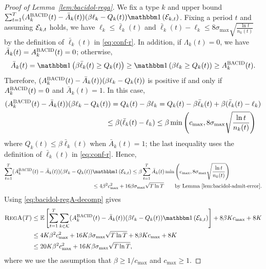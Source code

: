 \begin{proof}[Proof of Lemma~\ref{lem:bacidol-rega}]
We fix a type $k$ and upper bound $\sum_{t=1}^T (A_k^{\bacid}(t) - \bar{A}_k(t))(\beta \ell_k-Q_k(t))\indic{\set{E}_{k,t}}$. Fixing a period $t$ and assuming $\mathcal{E}_{k,t}$ holds, we have $\ell_k \leq \bar{\ell}_k(t)$ and 
$
\bar{\ell}_k(t) - \ell_k \leq 8\sigma_{\max}\sqrt{\frac{\ln t}{n_k(t)}}$
by the definition of $\bar{\ell}_k(t)$ in \eqref{eq:conf-r}. In addition, if $\Lambda_k(t) = 0$, we have $\bar{A}_k(t) = A_k^{\textsc{BACID}}(t) = 0$; otherwise,
\[\bar{A}_k(t) = \indic{\beta \bar{\ell}_k(t) \geq Q_k(t)} \geq \indic{\beta \ell_k \geq Q_k(t)} \geq A_k^{\bacid}(t).\]
Therefore, $(A_k^{\textsc{BACID}}(t) - \bar{A}_k(t))(\beta \ell_k-Q_k(t))$ is positive if and only if $A_k^{\textsc{BACID}}(t) = 0$ and $\bar{A}_k(t) = 1$. In this case,
\begin{align*}
(A_k^{\bacid}(t) - \bar{A}_k(t))(\beta \ell_k-Q_k(t)) = Q_k(t) - \beta \ell_k &= Q_k(t) - \beta \bar{\ell}_k(t) + \beta(\bar{\ell}_k(t) - \ell_k) \\
&\hspace{-1in}\leq \beta(\bar{\ell}_k(t) - \ell_k) \leq \beta\min\left(c_{\max},8\sigma_{\max}\sqrt{\frac{\ln t}{n_k(t)}}\right)
\end{align*}
where $Q_k(t) \leq \beta \bar{\ell}_k(t)$ when $\bar{A}_k(t) = 1$; the last inequality uses the definition of $\bar{\ell}_k(t)$ in \eqref{eq:conf-r}. Hence,
\begin{align*}
\sum_{t=1}^T (A_k^{\bacid}(t) - \bar{A}_k(t))(\beta \ell_k-Q_k(t))\indic{\set{E}_{k,t}} &\leq \beta\sum_{t=1}^T\bar{A}_k(t)\min\left(c_{\max},8\sigma_{\max}\sqrt{\frac{\ln t}{n_k(t)}}\right) \\
&\hspace{-1in}\leq 4\beta^2c^2_{\max}+16\beta \sigma_{\max}\sqrt{T\ln T} \qquad \text{by Lemma~\ref{lem:bacidol-admit-error}}.
\end{align*}
Using \eqref{eq:bacidol-regA-decomp} gives
\begin{align*}
\textsc{RegA}(T) &\leq \expect{\sum_{t=1}^T \sum_{k\in\set{K}} (A_k^{\bacid}(t) - \bar{A}_k(t))(\beta \ell_k-Q_k(t))\indic{\set{E}_{k,t}}} + 8\beta K c_{\max}+8K \\
&\leq 4K\beta^2c^2_{\max}+16K\beta \sigma_{\max}\sqrt{T\ln T} + 8\beta K c_{\max}+8K \\
&\leq 20K\beta^2c^2_{\max}+16K\beta \sigma_{\max}\sqrt{T\ln T},
\end{align*} 
where we use the assumption that $\beta \geq 1/c_{\max}$ and $c_{\max} \geq 1$.
\end{proof}

